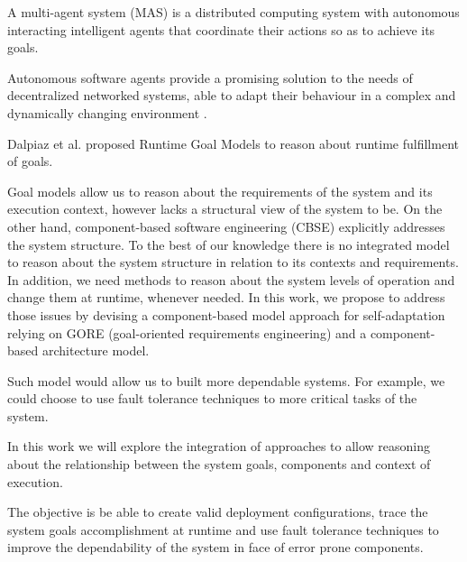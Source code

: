 A multi-agent system (MAS) is a distributed computing system with autonomous interacting intelligent agents that coordinate their actions so as to achieve its goals\cite{woolridge_introduction_2001}.

Autonomous software agents provide a promising solution to the needs of decentralized networked systems, able to adapt their behaviour in a complex and dynamically changing environment \cite{morandini_goal-oriented_2009}.

Dalpiaz et al.\cite{dalpiaz_runtime_2013} proposed Runtime Goal Models to reason about runtime fulfillment of goals.


Goal models allow us to reason about the requirements of the system and its execution context, however lacks a structural view of the system to be. On the other hand, component-based software engineering (CBSE) explicitly addresses the system structure. To the best of our knowledge there is no integrated model to reason about the system structure in relation to its contexts and requirements.
In addition, we need methods to reason about the system levels of operation and change them at runtime, whenever needed. In this work, we propose to address those issues by devising a component-based model approach for self-adaptation relying on GORE (goal-oriented requirements engineering) and a component-based architecture model.

Such model would allow us to built more dependable systems. For example, we could choose to use fault tolerance techniques to more critical tasks of the system.

 In this work we will explore the integration of approaches to allow reasoning about the relationship between the system goals, components and context of execution.
 
 The objective is be able to create valid deployment configurations, trace the system goals accomplishment at runtime and use fault tolerance techniques to improve the dependability of the system in face of error prone components.

